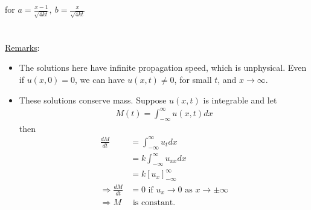 \documentclass[12pt, letterpaper]{article}
\begin{document}
for $\displaystyle a = \frac{x-1}{\sqrt{4kt}},\ b = \frac{x}{\sqrt{4kt}}$ \\ \\ \\ 
\underline{Remarks}:
\begin{itemize}
    \item The solutions here have infinite propagation speed, which is unphysical. Even if $u(x,0) = 0$,
    we can have $u(x,t) \ne 0$, for small $t$, and $x \rightarrow \infty$. 
    \item These solutions conserve mass. Suppose $u(x,t)$ is integrable and let 
    \begin{align*}
        M(t) = \int_{-\infty}^{\infty} u(x,t) dx 
    \end{align*}
    then \begin{align*}
        \frac{dM}{dt} &= \int_{-\infty}^{\infty} u_t dx \\
        &= k\int_{-\infty}^{\infty} u_{xx}dx \\
        &= k \left[u_x\right]^\infty_{-\infty} \\
        \Rightarrow \frac{dM}{dt} &= 0 \text{ if } u_x \rightarrow 0 \text{ as } x \rightarrow \pm \infty \\
        \Rightarrow M &\text{ is constant.}
    \end{align*}
\end{itemize}
\end{document}
